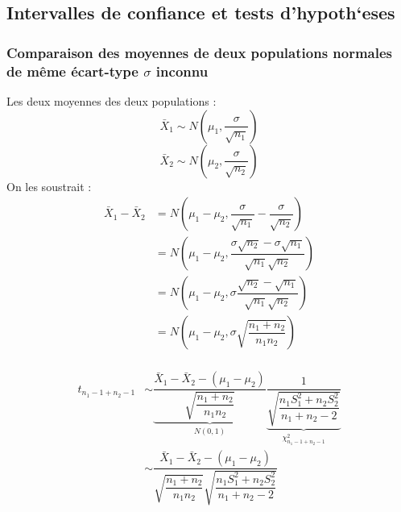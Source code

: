 \subsection{Intervalles de confiance et tests d'hypoth`eses}

\subsubsection{Comparaison des moyennes de deux populations normales de même écart-type $\sigma$ inconnu}
Les deux moyennes des deux populations :
$$\bar{X}_1 \sim N \left( \mu_1, \dfrac{\sigma}{\sqrt{n_1}} \right)$$
$$\bar{X}_2 \sim N \left( \mu_2, \dfrac{\sigma}{\sqrt{n_2}} \right)$$
On les soustrait :
\begin{align*}
\bar{X}_1 - \bar{X}_2 &= N \left( \mu_1 - \mu_2, \dfrac{\sigma}{\sqrt{n_1}} - \dfrac{\sigma}{\sqrt{n_2}} \right)\\
                      &= N \left( \mu_1 - \mu_2, \dfrac{\sigma\sqrt{n_2} - \sigma\sqrt{n_1}}{\sqrt{n_1}\sqrt{n_2}} \right)\\
                      &= N \left( \mu_1 - \mu_2, \sigma\dfrac{\sqrt{n_2} - \sqrt{n_1}}{\sqrt{n_1}\sqrt{n_2}} \right)\\
                      &= N \left( \mu_1 - \mu_2, \sigma\sqrt{\dfrac{n_1 + n_2}{n_1 n_2}} \right)\\
\end{align*}

\begin{align*}
t_{n_1-1+n_2-1} &\sim \underbrace{\dfrac{\bar{X}_1 - \bar{X}_2 - (\mu_1 - \mu_2)}{\sqrt{\dfrac{n_1+n_2}{n_1n_2}}}}_{\displaystyle N(0,1)} \underbrace{\dfrac{1}{\sqrt{\dfrac{n_1S^2_1+n_2S_2^2}{n_1+n_2-2}}}}_{\displaystyle\chi_{n_1-1+n_2-1}^2}\\
   &\sim \dfrac{\bar{X}_1 - \bar{X}_2 - (\mu_1 - \mu_2)}{\sqrt{\dfrac{n_1+n_2}{n_1n_2}}\sqrt{\dfrac{n_1S^2_1+n_2S_2^2}{n_1+n_2-2}}}
\end{align*}